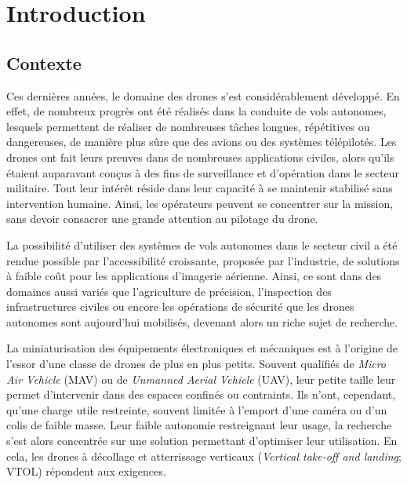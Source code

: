 \chapter*{Introduction}


\section*{Contexte}
Ces dernières années, le domaine des drones s'est considérablement développé. En effet, de nombreux progrès ont été réalisés dans la conduite de vols autonomes, lesquels permettent de réaliser de nombreuses tâches longues, répétitives ou dangereuses, de manière plus sûre que des avions ou des systèmes télépilotés. Les drones ont fait leurs preuves dans de nombreuses applications civiles, alors qu'ils étaient auparavant conçus à des fins de surveillance et d'opération dans le secteur militaire. Tout leur intérêt réside dans leur capacité à se maintenir stabilisé sans intervention humaine. Ainsi, les opérateurs peuvent se concentrer sur la mission, sans devoir consacrer une grande attention au pilotage du drone. 

La possibilité d'utiliser des systèmes de vols autonomes dans le secteur civil a été rendue possible par l'accessibilité croissante, proposée par l'industrie, de solutions à faible coût pour les applications d'imagerie aérienne. Ainsi, ce sont dans des domaines aussi variés que l'agriculture de précision,  l'inspection des infrastructures civiles ou encore les opérations de sécurité que les drones autonomes sont aujourd'hui mobilisés, devenant alors un riche sujet de recherche.

La miniaturisation des équipements électroniques et mécaniques est à l'origine de l'essor d'une classe de drones de plus en plus petits. Souvent qualifiés de \textit{Micro Air Vehicle} (MAV) ou de \textit{Unmanned Aerial Vehicle} (UAV), leur petite taille leur permet d'intervenir dans des espaces confinés ou contraints. Ils n'ont, cependant, qu'une charge utile restreinte, souvent limitée à l'emport d'une caméra ou d'un colis de faible masse. Leur faible autonomie restreignant leur usage, la recherche s'est alors concentrée sur une solution permettant d'optimiser leur utilisation. En cela, les drones à décollage et atterrissage verticaux (\textit{Vertical take-off and landing}; VTOL) répondent aux exigences.

